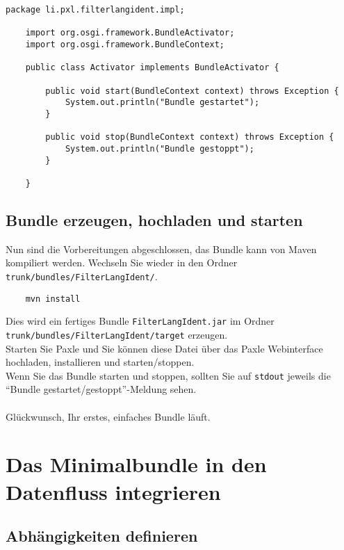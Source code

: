 \documentclass[a4paper,12pt]{scrartcl}
\begin{document}
\begin{lstlisting}[caption=Einfacher Activator mit Ausgabe für unser FilterLangIdent-Beispielbundle]
	package li.pxl.filterlangident.impl;
	
	import org.osgi.framework.BundleActivator;
	import org.osgi.framework.BundleContext;
	
	public class Activator implements BundleActivator {
	
		public void start(BundleContext context) throws Exception {
			System.out.println("Bundle gestartet");
		}
	
		public void stop(BundleContext context) throws Exception {
			System.out.println("Bundle gestoppt");
		}
	
	}
\end{lstlisting}

\subsection{Bundle erzeugen, hochladen und starten}

Nun sind die Vorbereitungen abgeschlossen, das Bundle kann von Maven kompiliert werden. Wechseln Sie wieder in den Ordner \lstinline[breaklines=false, basicstyle=\itshape]|trunk/bundles/FilterLangIdent/|.\\
\begin{lstlisting}
	mvn install
\end{lstlisting}
Dies wird ein fertiges Bundle \lstinline[breaklines=false, basicstyle=\itshape]|FilterLangIdent.jar| im Ordner \lstinline[breaklines=false, basicstyle=\itshape]|trunk/bundles/FilterLangIdent/target| erzeugen.\\
Starten Sie Paxle und Sie können diese Datei über das Paxle Webinterface hochladen, installieren und starten/stoppen.\\
Wenn Sie das Bundle starten und stoppen, sollten Sie auf \lstinline[breaklines=false, basicstyle=\itshape]|stdout| jeweils die "`Bundle gestartet/gestoppt"'-Meldung sehen.\\
\\
Glückwunsch, Ihr erstes, einfaches Bundle läuft.

\section{Das Minimalbundle in den Datenfluss integrieren}

\subsection{Abhängigkeiten definieren}
\end{document}
